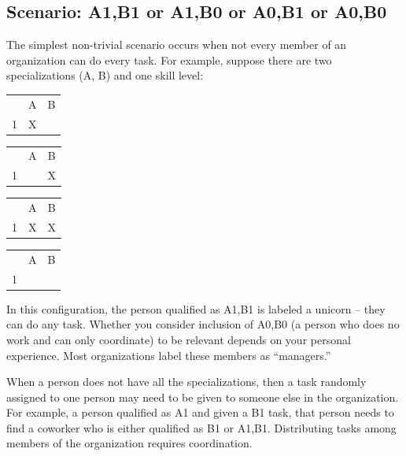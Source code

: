 \subsection*{Scenario: A1,B1 or A1,B0 or A0,B1 or A0,B0}

The simplest non-trivial scenario occurs when not every member of an organization can do every task. For example, suppose  there are two specializations (A, B) and one skill level: 

\begin{center}
\begin{tabular}{c|c|c|}
  & A & B \\
\cline{2-3}
1 & X &   \\
\cline{2-3}
\end{tabular} \quad
\begin{tabular}{c|c|c|}
  & A & B \\
\cline{2-3}
1 &   & X \\
\cline{2-3}
\end{tabular} \quad
\begin{tabular}{c|c|c|}
  & A & B \\
\cline{2-3}
1 & X & X \\
\cline{2-3}
\end{tabular} \quad
\begin{tabular}{c|c|c|}
  & A & B \\
\cline{2-3}
1 &   &   \\
\cline{2-3}
\end{tabular}
\end{center}
In this configuration, the person qualified as A1,B1 is labeled a unicorn -- they can do any task. Whether you consider inclusion of A0,B0 (a person who does no work and can only coordinate) to be relevant depends on your personal experience. Most organizations label these members as ``managers.'' 

When a person does not have all the specializations, then a task randomly assigned to one person may need to be given to someone else in the organization. For example, a person qualified as A1 and given a B1 task, that person needs to find a coworker who is either qualified as B1 or A1,B1. Distributing tasks among members of the organization requires coordination.




